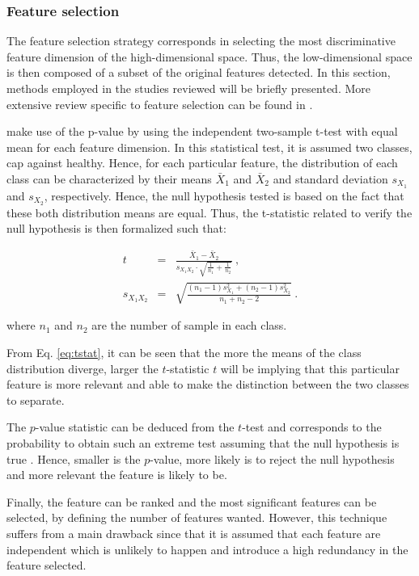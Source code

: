 \subsubsection{Feature selection}\label{subsubsec:featsel}

The feature selection strategy corresponds in selecting the most discriminative feature dimension of the high-dimensional space. Thus, the low-dimensional space is then composed of a subset of the original features detected. In this section, methods employed in the studies reviewed will be briefly presented. More extensive review specific to feature selection can be found in \cite{Saeys2007}.

\cite{Niaf2011,Niaf2012} make use of the p-value by using the independent two-sample t-test with equal mean for each feature dimension. In this statistical test, it is assumed two classes, \ac{cap} against healthy. Hence, for each particular feature, the distribution of each class can be characterized by their means $\bar{X}_1$ and $\bar{X}_2$ and standard deviation $s_{X_1}$ and $s_{X_2}$, respectively. Hence, the null hypothesis tested is based on the fact that these both distribution means are equal. Thus, the t-statistic related to verify the null hypothesis is then formalized such that:

\begin{eqnarray}
t & = & \frac{\bar {X}_1 - \bar{X}_2}{s_{X_1X_2} \cdot \sqrt{\frac{1}{n_1}+\frac{1}{n_2}}} \ , \label{eq:tstat} \\
s_{X_1X_2} & = & \sqrt{\frac{(n_1-1)s_{X_1}^2+(n_2-1)s_{X_2}^2}{n_1+n_2-2}} \ . \nonumber
\end{eqnarray}

\noindent where $n_1$ and $n_2$ are the number of sample in each class.

From Eq. \ref{eq:tstat}, it can be seen that the more the means of the class distribution diverge, larger the $t$-statistic $t$ will be implying that this particular feature is more relevant and able to make the distinction between the two classes to separate. 

The $p$-value statistic can be deduced from the $t$-test and corresponds to the probability to obtain such an extreme test assuming that the null hypothesis is true \cite{Goodman1999}. Hence, smaller is the $p$-value, more likely is to reject the null hypothesis and more relevant the feature is likely to be.

Finally, the feature can be ranked and the most significant features can be selected, by defining the number of features wanted. However, this technique suffers from a main drawback since that it is assumed that each feature are independent which is unlikely to happen and introduce a high redundancy in the feature selected.

